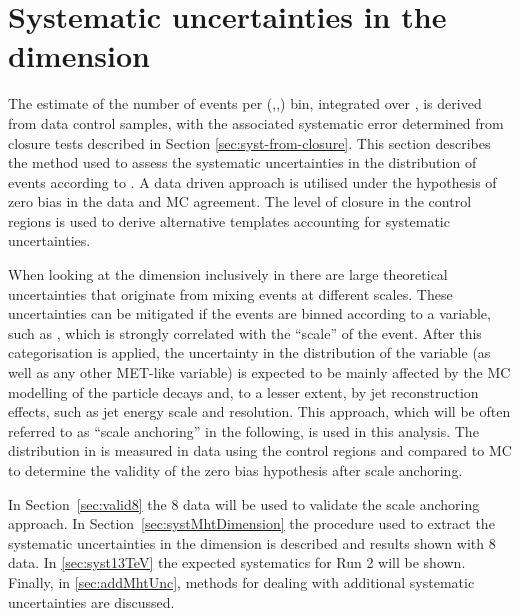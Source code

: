 \section{Systematic uncertainties in the \mht dimension}
\label{sec:syst-on-shape}

The estimate of the number of events per (\njet,\nb,\scalht) bin,
integrated over \mht, is derived from data control samples, with
the associated systematic error determined from closure tests
described in Section \ref{sec:syst-from-closure}. This section
describes the method used to assess the systematic uncertainties in
the distribution of events according to \mht. A data driven approach is
utilised under the hypothesis of zero bias in the data and MC agreement.
The level of closure in the control regions is used
to derive alternative templates accounting for systematic uncertainties.

When looking at the \mht dimension inclusively in \scalht there are
large theoretical uncertainties that originate from mixing events
at different scales. These uncertainties can be mitigated if the events 
are binned according to a variable, such as \scalht, 
which is strongly correlated with the “scale” of the event. 
After this categorisation is applied, the uncertainty in 
the distribution of the \mht variable
(as well as any other MET-like variable) is expected to be 
mainly affected by the MC modelling of the particle 
decays and, to a lesser extent, by jet reconstruction effects, 
such as jet energy scale and resolution. 
This approach, which will be often referred to as “scale anchoring” 
in the following, is used in this analysis. The distribution in \mht
is measured in data using the control regions and compared to MC
to determine the validity of the zero bias hypothesis after scale anchoring.

In Section~\ref{sec:valid8} the 8 \TeV data will be used 
to validate the scale anchoring approach. 
In Section~\ref{sec:systMhtDimension} 
the procedure used to extract the systematic uncertainties in the 
\mht dimension is described and results shown with 8 \TeV data. 
In \ref{sec:syst13TeV} the expected systematics for Run 2 will be shown. 
Finally, in \ref{sec:addMhtUnc}, methods for dealing with 
additional systematic uncertainties are discussed.



